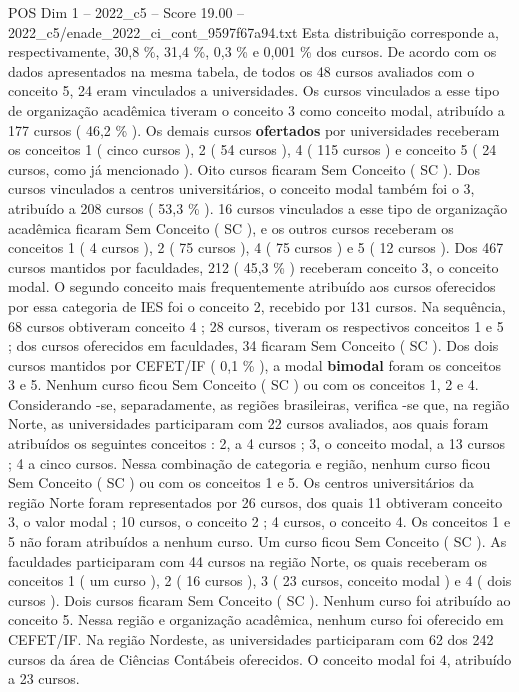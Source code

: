 \begin{textsample}{POS Dim 1 – 2022\_c5 – Score 19.00 – 2022\_c5/enade\_2022\_ci\_cont\_9597f67a94.txt}
Esta distribuição corresponde a, respectivamente, 30,8 \%, 31,4 \%, 0,3 \% e 0,001 \% dos cursos.
De acordo com os dados apresentados na mesma tabela, de todos os 48 cursos avaliados com o conceito 5, 24 eram vinculados a universidades.
Os cursos vinculados a esse tipo de organização acadêmica tiveram o conceito 3 como conceito modal, atribuído a 177 cursos ( 46,2 \% ).
Os demais cursos \textbf{ofertados} por universidades receberam os conceitos 1 ( cinco cursos ), 2 ( 54 cursos ), 4 ( 115 cursos ) e conceito 5 ( 24 cursos, como já mencionado ).
Oito cursos ficaram Sem Conceito ( SC ).
Dos cursos vinculados a centros universitários, o conceito modal também foi o 3, atribuído a 208 cursos ( 53,3 \% ). 16 cursos vinculados a esse tipo de organização acadêmica ficaram Sem Conceito ( SC ), e os outros cursos receberam os conceitos 1 ( 4 cursos ), 2 ( 75 cursos ), 4 ( 75 cursos ) e 5 ( 12 cursos ).
Dos 467 cursos mantidos por faculdades, 212 ( 45,3 \% ) receberam conceito 3, o conceito modal.
O segundo conceito mais frequentemente atribuído aos cursos oferecidos por essa categoria de IES foi o conceito 2, recebido por 131 cursos.
Na sequência, 68 cursos obtiveram conceito 4 ; 28 cursos, tiveram os respectivos conceitos 1 e 5 ; dos cursos oferecidos em faculdades, 34 ficaram Sem Conceito ( SC ).
Dos dois cursos mantidos por CEFET/IF ( 0,1 \% ), a modal \textbf{bimodal} foram os conceitos 3 e 5.
Nenhum curso ficou Sem Conceito ( SC ) ou com os conceitos 1, 2 e 4.
Considerando -se, separadamente, as regiões brasileiras, verifica -se que, na região Norte, as universidades participaram com 22 cursos avaliados, aos quais foram atribuídos os seguintes conceitos : 2, a 4 cursos ; 3, o conceito modal, a 13 cursos ; 4 a cinco cursos.
Nessa combinação de categoria e região, nenhum curso ficou Sem Conceito ( SC ) ou com os conceitos 1 e 5.
Os centros universitários da região Norte foram representados por 26 cursos, dos quais 11 obtiveram conceito 3, o valor modal ; 10 cursos, o conceito 2 ; 4 cursos, o conceito 4.
Os conceitos 1 e 5 não foram atribuídos a nenhum curso.
Um curso ficou Sem Conceito ( SC ).
As faculdades participaram com 44 cursos na região Norte, os quais receberam os conceitos 1 ( um curso ), 2 ( 16 cursos ), 3 ( 23 cursos, conceito modal ) e 4 ( dois cursos ).
Dois cursos ficaram Sem Conceito ( SC ).
Nenhum curso foi atribuído ao conceito 5.
Nessa região e organização acadêmica, nenhum curso foi oferecido em CEFET/IF.
Na região Nordeste, as universidades participaram com 62 dos 242 cursos da área de Ciências Contábeis oferecidos.
O conceito modal foi 4, atribuído a 23 cursos.

\end{textsample}
